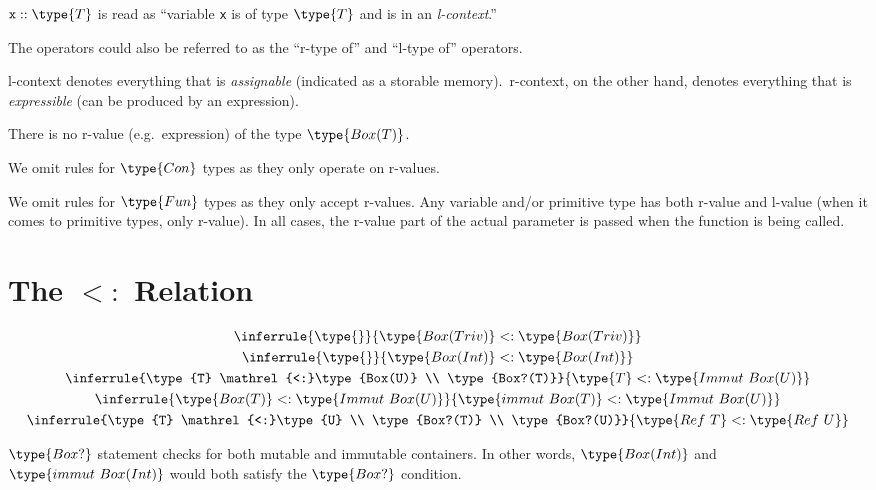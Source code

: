 \documentclass{article}
\newcommand\subtype{\mathrel{<:}}
\newcommand{\syntax}{\texttt}
\begin{document}
$\syntax{x} :: \type{T}$ is read as ``variable \syntax{x} is of type $\type{T}$
and is in an \textit{l-context}.''

The operators could also be referred to as the ``r-type of'' and ``l-type of''
operators.

\medskip

l-context denotes everything that is \textit{assignable} (indicated as a
storable memory).\ r-context, on the other hand, denotes everything that is
\textit{expressible} (can be produced by an expression).

\medskip

There is no r-value (e.g.\ expression) of the type $\type{Box(T)}$.

\medskip

We omit rules for $\type{Con}$ types as they only operate on r-values.

\medskip

We omit rules for $\type{Fun}$ types as they only accept r-values.
Any variable and/or primitive type has both r-value and l-value (when it comes
to primitive types, only r-value). In all cases, the r-value part of the actual
parameter is passed when the function is being called.


\section*{The $\subtype$ Relation}

\begin{gather}
  \inferrule{\type{}}{\type{Box(Triv)} \subtype \type{Box(Triv)}}\\
  \inferrule{\type{}}{\type{Box(Int)} \subtype \type{Box(Int)}}\\
  \inferrule{\type{T} \subtype \type{Box(U)} \\ \type{Box?(T)}}{\type{T} \subtype \type{Immut\ Box(U)}}\\
  \inferrule{\type{Box(T)} \subtype \type{Immut\ Box(U)}}{\type{immut\ Box(T)} \subtype \type{Immut\ Box(U)}}\\
  \inferrule{\type{T} \subtype \type{U} \\ \type{Box?(T)} \\ \type{Box?(U)}}{\type{Ref\ T} \subtype \type{Ref\ U}}
\end{gather}

$\type{Box?}$ statement checks for both mutable and immutable containers.
In other words, $\type{Box(Int)}$ and $\type{immut\ Box(Int)}$ would both
satisfy the $\type{Box?}$ condition.

\end{document}

